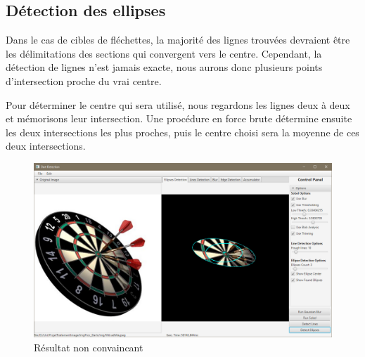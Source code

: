 \documentclass[a4paper, 11pt]{article}
\begin{document}
\begin{multicols}{2}
\section{Détection des ellipses}
\par
Dans le cas de cibles de fléchettes, la majorité des lignes trouvées devraient être les délimitations des sections qui convergent vers le centre. Cependant, la détection de lignes n'est jamais exacte, nous aurons donc plusieurs points d'intersection proche du \og vrai \fg{} centre.
\par
Pour déterminer le centre qui sera utilisé, nous regardons les lignes deux à deux et mémorisons leur intersection. Une procédure en \og force brute \fg{} détermine ensuite les deux intersections les plus proches, puis le centre choisi sera la moyenne de ces deux intersections.

\end{multicols}

\begin{figure}[!h]
\centering
\includegraphics[width=0.85\linewidth]{img/rotated_result_00.png}
\vspace{-2mm}
\caption{Résultat non convaincant}
\label{fig:rotatedResult00}
\end{figure}
\end{document}
